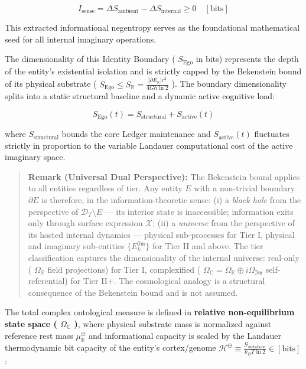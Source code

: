 \documentclass[11pt,a4paper]{article}
\theoremstyle{definition}
\theoremstyle{remark}
\begin{document}
\begin{equation}
\boxed{I_{\text{sense}} = \Delta S_{\text{ambient}} - \Delta S_{\text{internal}} \ge 0 \quad [\mathrm{bits}]}
\end{equation}


This extracted informational negentropy serves as the foundational mathematical seed for all internal imaginary operations.

The dimensionality of this Identity Boundary ( $S_{\text{Ego}}$ in bits) represents the depth of the entity's existential isolation and is strictly capped by the Bekenstein bound of its physical substrate ( $S_{\text{Ego}} \le S_{\mathbb{R}} = \frac{|\partial E_{\mathbb{R}}|c^3}{4G\hbar\ln 2}$ ). The boundary dimensionality splits into a static structural baseline and a dynamic active cognitive load:


\begin{equation}
\boxed{S_{\text{Ego}}(t) = S_{\text{structural}} + S_{\text{active}}(t)}
\end{equation}


where $S_{\text{structural}}$ bounds the core Ledger maintenance and $S_{\text{active}}(t)$ fluctuates strictly in proportion to the variable Landauer computational cost of the active imaginary space.

\begin{quote}\textbf{Remark (Universal Dual Perspective):} The Bekenstein bound applies to all entities regardless of tier. Any entity $E$ with a non-trivial boundary $\partial E$ is therefore, in the information-theoretic sense: (i) a \textit{black hole} from the perspective of $\mathcal{D}_T \setminus E$ — its interior state is inaccessible; information exits only through surface expression $\mathcal{X}$; (ii) a \textit{universe} from the perspective of its hosted internal dynamics — physical sub-processes for Tier I, physical and imaginary sub-entities $\{E_k^{\mathfrak{Im}}\}$ for Tier II and above. The tier classification captures the dimensionality of the internal universe: real-only ( $\Omega_{\mathbb{R}}$ field projections) for Tier I, complexified ( $\Omega_{\mathbb{C}} = \Omega_{\mathbb{R}} \oplus i\Omega_{\mathfrak{Im}}$ self-referential) for Tier II+. The cosmological analogy is a structural consequence of the Bekenstein bound and is not assumed.\end{quote}

The total complex ontological measure is defined in \textbf{relative non-equilibrium state space ( $\Omega_{\mathbb{C}}$ )}, where physical substrate mass is normalized against reference rest mass $\mu_{\mathbb{R}}^\ominus$ and informational capacity is scaled by the Landauer thermodynamic bit capacity of the entity's cortex/genome $\mathcal{H}^\ominus \equiv \frac{\mathcal{G}_{\text{metabolic}}}{k_B T \ln 2} \in [\mathrm{bits}]$:
\end{document}
